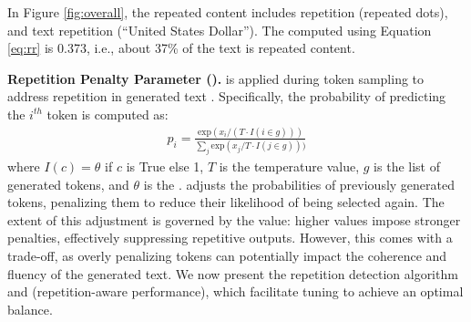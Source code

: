 In Figure \ref{fig:overall}, the repeated content includes \nwc repetition (repeated dots), and text repetition (``United States Dollar''). The \rr computed using Equation \ref{eq:rr} is 0.373, i.e., about 37\% of the text is repeated content. 



\noindent
\textbf{Repetition Penalty Parameter (\rp).} \rp is applied during token sampling to address repetition in generated text \cite{Keskar2019CTRLAC}. Specifically, the probability of predicting the $i^{th}$ token is computed as:
\begin{align}
    p_i=\frac{\text{exp}(x_i/(T\cdot I(i\in g)))}{\sum_j\text{exp}(x_j/T\cdot I(j\in g)))}
\end{align}
where $I(c) = \theta$ if $c$ is True else 1, $T$ is the temperature value, $g$ is the list of generated tokens, and $\theta$ is the \rp \cite{Keskar2019CTRLAC}. \rp adjusts the probabilities of previously generated tokens, penalizing them to reduce their likelihood of being selected again. The extent of this adjustment is governed by the \rp value: higher \rp values impose stronger penalties, effectively suppressing repetitive outputs. However, this comes with a trade-off, as overly penalizing tokens can potentially impact the coherence and fluency of the generated text. We now present the repetition detection algorithm and \rap (repetition-aware performance), which facilitate tuning \rp to achieve an optimal balance. 



